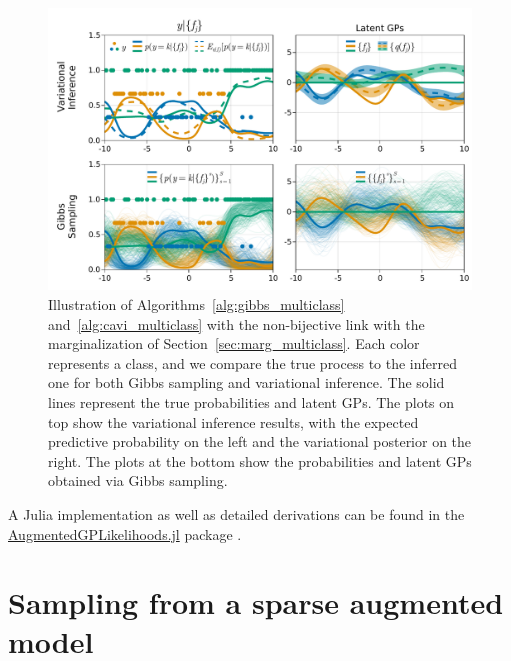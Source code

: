\begin{figure}
    \includegraphics[width=\textwidth]{./chapters/8_discussions/figures/categorical_nonbijective.pdf}
    \caption{Illustration of Algorithms~\ref{alg:gibbs_multiclass} and~\ref{alg:cavi_multiclass} with the non-bijective link with the marginalization of Section~\ref{sec:marg_multiclass}.
    Each color represents a class, and we compare the true process to the inferred one for both Gibbs sampling and variational inference.
    The solid lines represent the true probabilities and latent \ac{GPs}.
    The plots on top show the variational inference results, with the expected predictive probability on the left and the variational posterior on the right.
    The plots at the bottom show the probabilities and latent GPs obtained via Gibbs sampling.}
    \label{fig:multiclass}
\end{figure}

A Julia implementation as well as detailed derivations can be found in the \href{https://github.com/JuliaGaussianProcesses/AugmentedGPLikelihoods.jl}{AugmentedGPLikelihoods.jl} package \cite{theo_galy_fajou_2022_6347022}.

\section{Sampling from a sparse augmented model}

